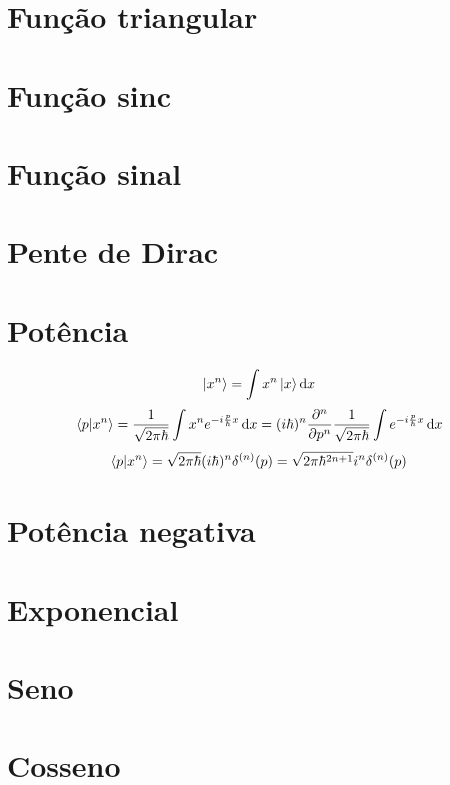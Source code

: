 \documentclass[report,14pt,openright,oneside,a4paper,brazil]{abntex2}
\newcommand{\abrir}[2]{\int{#1}\ket{#2}\dd{#2}}
\newcommand{\qfourier}[1]{\frac{1}{\sqrt{2\pi\hbar}}\int{#1} e^{-i \frac{p}{\hbar} x} \dd{x}}
\begin{document}
\section{Função triangular}

\section{Função sinc}

\section{Função sinal}

\section{Pente de Dirac}

\section{Potência}
\begin{equation}
    \ket{x^n}=\abrir{x^n}{x}
\end{equation}
\begin{equation}
    \braket{p}{x^n}=\qfourier{x^n}
    =(i\hbar)^n\pdv[n]{}{p} \qfourier{}
\end{equation}
\begin{equation}
    \braket{p}{x^n}=\sqrt{2\pi\hbar}(i\hbar)^n\delta^{(n)}(p)=\sqrt{2\pi\hbar^{2n+1}}i^n\delta^{(n)}(p)
\end{equation}

\section{Potência negativa}

\section{Exponencial}

\section{Seno}

\section{Cosseno}
\end{document}
